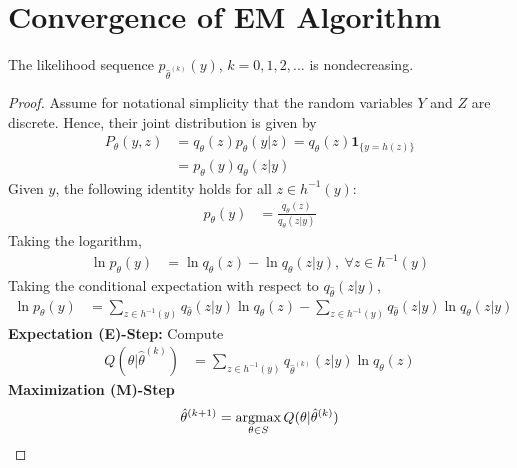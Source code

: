 \documentclass[11pt]{elegantbook}
\newcommand{\argmax}{\operatornamewithlimits{argmax}}
\begin{document}
\section{Convergence of EM Algorithm}
\begin{theorem}
    The likelihood sequence $p_{\hat{\theta}^{(k)}}(y)$, $k = 0, 1, 2, ...$ is nondecreasing.
\end{theorem}
\begin{proof}
    Assume for notational simplicity that the random variables $Y$ and $Z$ are discrete. Hence, their joint distribution is given by
    \begin{equation}
        \begin{aligned}
            P_\theta(y,z)&=q_\theta(z)p_\theta(y|z)=q_\theta(z)\mathbf{1}_{\{y=h(z)\}}\\
            &=p_\theta(y)q_\theta(z|y)
        \end{aligned}
        \nonumber
    \end{equation}
    Given $y$, the following identity holds for all $z \in h^{-1}(y)$:
    \begin{equation}
        \begin{aligned}
            p_\theta(y)&=\frac{q_\theta(z)}{q_\theta(z|y)}
        \end{aligned}
        \nonumber
    \end{equation}
    Taking the logarithm,
    \begin{equation}
        \begin{aligned}
            \ln p_\theta(y)&= \ln q_\theta(z)-\ln q_\theta(z|y),\ \forall z\in h^{-1}(y)
        \end{aligned}
        \nonumber
    \end{equation}
    Taking the conditional expectation with respect to $q_{\hat{\theta}}(z|y)$,
    \begin{equation}
        \begin{aligned}
            \ln p_\theta(y)&= \sum_{z\in h^{-1}(y)}q_{\hat{\theta}}(z|y)\ln q_\theta(z)-\sum_{z\in h^{-1}(y)}q_{\hat{\theta}}(z|y)\ln q_\theta(z|y)
        \end{aligned}
        \tag{1}
    \end{equation}
    \textbf{Expectation (E)-Step:}
        Compute
        \begin{equation}
            \begin{aligned}
                Q(\theta|\hat{\theta}^{(k)})
                &=\sum_{z\in h^{-1}(y)}q_{\hat{\theta}^{(k)}}(z|y)\ln q_\theta(z)
            \end{aligned}
            \nonumber
        \end{equation}
    \textbf{Maximization (M)-Step} $$\hat{\theta}^{(k+1)}=\argmax_{\theta\in S}Q(\theta|\hat{\theta}^{(k)})$$


\end{proof}
\end{document}
